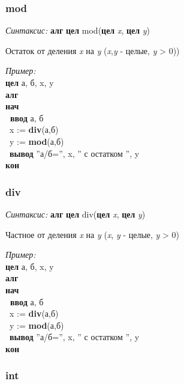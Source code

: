 \documentclass[12pt,a4paper]{article}
\newcommand{\otstup}{\textperiodcentered\ }
\begin{document}
\normalfont
\subsubsection{mod}

\emph{Синтаксис:} \textbf{алг} \textbf{цел} mod(\textbf{цел} \emph{x}, \textbf{цел} \emph{y})


      

		Остаток от деления \emph{x} на \emph{y}  (\emph{x},\emph{y} - целые, \emph{y} > 0))
      
\emph{Пример:} 
\sffamily
~\\\textbf{цел} а, б, x, y
~\\\textbf{алг
~\\нач
~\\\otstup ввод} а, б
~\\\otstup x := \textbf{div}(а,б)
~\\\otstup y := \textbf{mod}(а,б)
~\\\otstup \textbf{вывод} ''а/б='', x, '' с остатком '', y
~\\\textbf{кон}



 
 

\normalfont
\subsubsection{div}

\emph{Синтаксис:} \textbf{алг} \textbf{цел} div(\textbf{цел} \emph{x}, \textbf{цел} \emph{y})


    
 Частное от деления  \emph{x} на \emph{y}  (\emph{x}, \emph{y} - целые, \emph{y} > 0)

\emph{Пример:} 
\sffamily
~\\\textbf{цел} а, б, x, y
~\\\textbf{алг
~\\нач
~\\\otstup ввод} а, б
~\\\otstup x := \textbf{div}(а,б)
~\\\otstup y := \textbf{mod}(а,б)
~\\\otstup \textbf{вывод} ''а/б='', x, '' с остатком '', y
~\\\textbf{кон}


 



 
\normalfont
\subsubsection{int}
\label{int}
\end{document}
